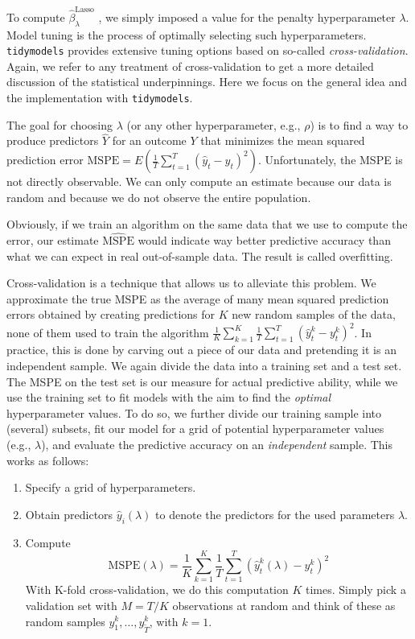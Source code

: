 \documentclass[
]{book}
\providecommand{\tightlist}{%
  \setlength{\itemsep}{0pt}\setlength{\parskip}{0pt}}
\begin{document}
To compute \(\hat\beta_\lambda^\text{Lasso}\) , we simply imposed a value for the penalty hyperparameter \(\lambda\). Model tuning is the process of optimally selecting such hyperparameters. \texttt{tidymodels} provides extensive tuning options based on so-called \emph{cross-validation}. Again, we refer to any treatment of cross-validation to get a more detailed discussion of the statistical underpinnings. Here we focus on the general idea and the implementation with \texttt{tidymodels}.

The goal for choosing \(\lambda\) (or any other hyperparameter, e.g., \(\rho\)) is to find a way to produce predictors \(\hat{Y}\) for an outcome \(Y\) that minimizes the mean squared prediction error \(\text{MSPE} = E\left( \frac{1}{T}\sum_{t=1}^T (\hat{y}_t - y_t)^2 \right)\). Unfortunately, the MSPE is not directly observable. We can only compute an estimate because our data is random and because we do not observe the entire population.

Obviously, if we train an algorithm on the same data that we use to compute the error, our estimate \(\hat{\text{MSPE}}\) would indicate way better predictive accuracy than what we can expect in real out-of-sample data. The result is called overfitting.

Cross-validation is a technique that allows us to alleviate this problem. We approximate the true MSPE as the average of many mean squared prediction errors obtained by creating predictions for \(K\) new random samples of the data, none of them used to train the algorithm \(\frac{1}{K} \sum_{k=1}^K \frac{1}{T}\sum_{t=1}^T \left(\hat{y}_t^k - y_t^k\right)^2\). In practice, this is done by carving out a piece of our data and pretending it is an independent sample. We again divide the data into a training set and a test set. The MSPE on the test set is our measure for actual predictive ability, while we use the training set to fit models with the aim to find the \emph{optimal} hyperparameter values. To do so, we further divide our training sample into (several) subsets, fit our model for a grid of potential hyperparameter values (e.g., \(\lambda\)), and evaluate the predictive accuracy on an \emph{independent} sample. This works as follows:

\begin{enumerate}
\def\labelenumi{\arabic{enumi}.}
\tightlist
\item
  Specify a grid of hyperparameters.
\item
  Obtain predictors \(\hat{y}_i(\lambda)\) to denote the predictors for the used parameters \(\lambda\).
\item
  Compute \[
  \text{MSPE}(\lambda) = \frac{1}{K} \sum_{k=1}^K \frac{1}{T}\sum_{t=1}^T \left(\hat{y}_t^k(\lambda) - y_t^k\right)^2 
  \] With K-fold cross-validation, we do this computation \(K\) times. Simply pick a validation set with \(M=T/K\) observations at random and think of these as random samples \(y_1^k, \dots, y_{\tilde{T}}^k\), with \(k=1\).
\end{enumerate}
\end{document}

